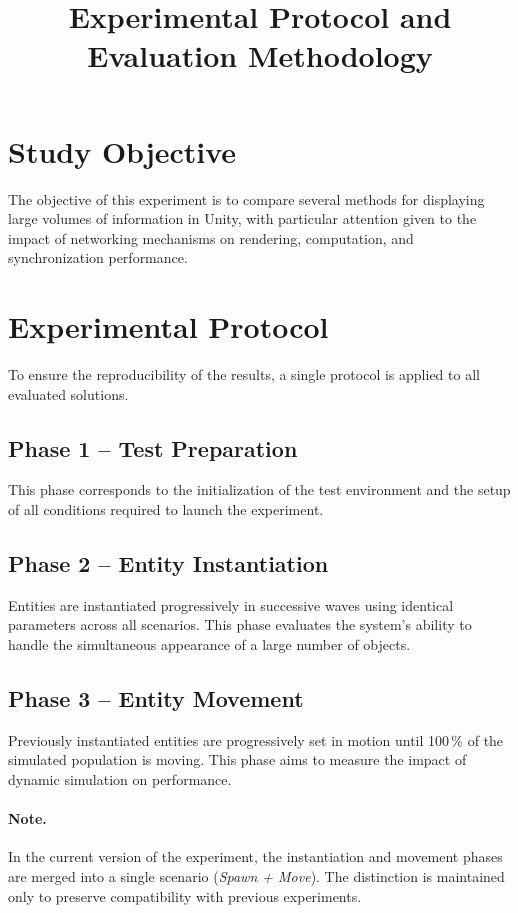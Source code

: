 \documentclass[11pt,a4paper]{article}
\title{Experimental Protocol and Evaluation Methodology}
\author{}
\date{}
\begin{document}
\maketitle

\section{Study Objective}

The objective of this experiment is to compare several methods for displaying large volumes of information in Unity, with particular attention given to the impact of networking mechanisms on rendering, computation, and synchronization performance.

\section{Experimental Protocol}

To ensure the reproducibility of the results, a single protocol is applied to all evaluated solutions.

\subsection{Phase 1 -- Test Preparation}

This phase corresponds to the initialization of the test environment and the setup of all conditions required to launch the experiment.

\subsection{Phase 2 -- Entity Instantiation}

Entities are instantiated progressively in successive waves using identical parameters across all scenarios. This phase evaluates the system's ability to handle the simultaneous appearance of a large number of objects.

\subsection{Phase 3 -- Entity Movement}

Previously instantiated entities are progressively set in motion until 100\,\% of the simulated population is moving. This phase aims to measure the impact of dynamic simulation on performance.

\paragraph{Note.}
In the current version of the experiment, the instantiation and movement phases are merged into a single scenario (\textit{Spawn + Move}). The distinction is maintained only to preserve compatibility with previous experiments.
\end{document}
